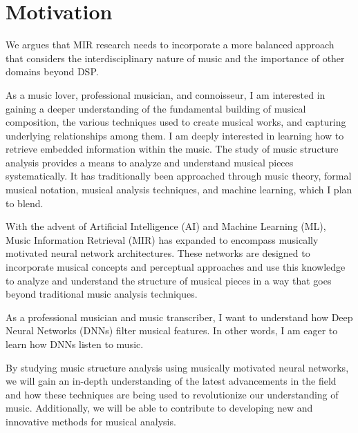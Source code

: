 \section{Motivation}

We argues that MIR research needs to incorporate a more balanced approach that considers the interdisciplinary nature of music and the importance of other domains beyond DSP.

As a music lover, professional musician, and connoisseur, I am interested in gaining a deeper understanding of the fundamental building of musical composition, the various techniques used to create musical works, and capturing underlying relationships among them. I am deeply interested in learning how to retrieve embedded information within the music. The study of music structure analysis provides a means to analyze and understand musical pieces systematically. It has traditionally been approached through music theory, formal musical notation, musical analysis techniques, and machine learning, which I plan to blend.

With the advent of Artificial Intelligence (AI) and Machine Learning (ML), Music Information Retrieval (MIR) has expanded to encompass musically motivated neural network architectures. These networks are designed to incorporate musical concepts and perceptual approaches and use this knowledge to analyze and understand the structure of musical pieces in a way that goes beyond traditional music analysis techniques.

As a professional musician and music transcriber, I want to understand how Deep Neural Networks (DNNs) filter musical features. In other words, I am eager to learn how DNNs listen to music.

By studying music structure analysis using musically motivated neural networks, we will gain an in-depth understanding of the latest advancements in the field and how these techniques are being used to revolutionize our understanding of music. Additionally, we will be able to contribute to developing new and innovative methods for musical analysis.
